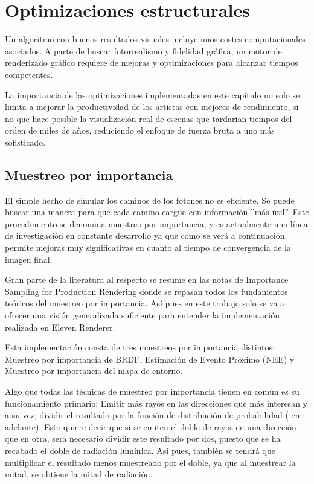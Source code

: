 ﻿\chapter{Optimizaciones estructurales}
\label{chap:4}

Un algoritmo con buenos resultados visuales incluye unos costes computacionales asociados. A parte de buscar fotorrealismo y fidelidad gráfica, un motor de renderizado gráfico requiere de mejoras y optimizaciones para alcanzar tiempos competentes.

La importancia de las optimizaciones implementadas en este capítulo no solo se limita a mejorar la productividad de los artistas con mejoras de rendimiento, si no que hace posible la visualización real de escenas que tardarían tiempos del orden de miles de años, reduciendo el enfoque de fuerza bruta a uno más sofisticado.
	
\section{Muestreo por importancia}
\label{sec:mi}

El simple hecho de simular los caminos de los fotones no es eficiente. Se puede buscar una manera para que cada camino cargue con información ''más útil''. Este procedimiento se denomina muestreo por importancia, y es actualmente una línea de investigación en constante desarrollo ya que como se verá a continuación, permite mejoras muy significativas en cuanto al tiempo de convergencia de la imagen final.

Gran parte de la literatura al respecto se resume en las notas de Importance Sampling for Production Rendering\cite{colbert2010importance} donde se repasan todos los fundamentos teóricos del muestreo por importancia. Así pues en este trabajo solo se va a ofrecer una visión generalizada suficiente para entender la implementación realizada en Eleven Renderer.

Esta implementación consta de tres muestreos por importancia distintos: Muestreo por importancia de BRDF, Estimación de Evento Próximo (NEE) y Muestreo por importancia del mapa de entorno.

Algo que todas las técnicas de  muestreo por importancia tienen en común es su funcionamiento primario: Emitir más rayos en las direcciones que más interesan y a su vez, dividir el resultado por la función de distribución de probabilidad ( en adelante). Esto quiere decir que si se emiten el doble de rayos en una dirección que en otra, será necesario dividir este resultado por dos, puesto que se ha recabado el doble de radiación lumínica. Así pues, también se tendrá que multiplicar el resultado menos muestreado por el doble, ya que al muestrear la mitad, se obtiene la mitad de radiación.

